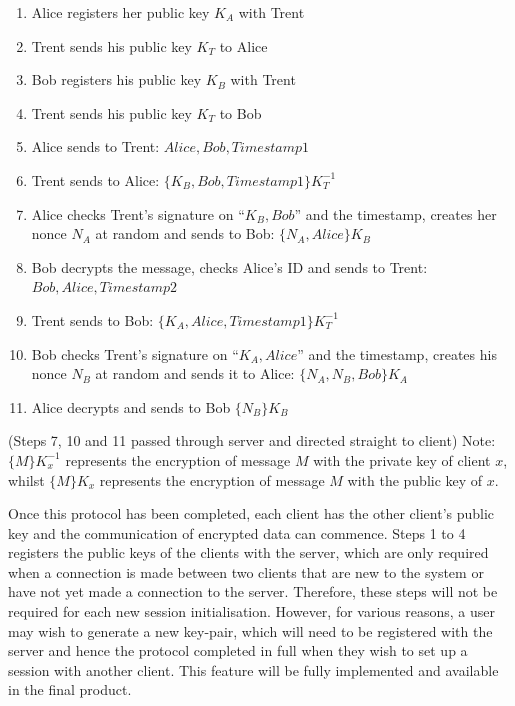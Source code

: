 \documentclass[a4paper,11pt]{article}
\begin{document}
\begin{enumerate}
  \item Alice registers her public key $ K_{A} $ with Trent
  \item Trent sends his public key $ K_{T} $ to Alice
  \item Bob registers his public key $ K_{B} $ with Trent
  \item Trent sends his public key $ K_{T} $ to Bob
  \item Alice sends to Trent: $ Alice, Bob, Timestamp1 $
  \item Trent sends to Alice: $ \{K_{B},Bob, Timestamp1\} K_{T}^{-1} $
  \item Alice checks Trent’s signature on “$ {K_{B},Bob} $” and the timestamp, creates her nonce $ N_{A} $ at random and sends to Bob: $ \{N_{A} , Alice \}K_{B} $
  \item Bob decrypts the message, checks Alice’s ID and sends to Trent: $ Bob, Alice, Timestamp2 $
  \item Trent sends to Bob: $ \{K_{A} , Alice, Timestamp1\}K_{T}^{-1} $
  \item Bob checks Trent’s signature on “$ K_{A}, Alice $” and the timestamp, creates his nonce $ N_{B} $ at random and sends it to Alice: $ \{N_{A}, N_{B}, Bob\}K_{A} $
  \item Alice decrypts and sends to Bob $ \{N_{B}\}K_{B} $
\end{enumerate}

(Steps 7, 10 and 11 passed through server and directed straight to client)
Note: $ \{M\}K_{x}^{-1} $ represents the encryption of message $ M $ with the private key of client $ x $, whilst $ \{M\}K_{x} $ represents the encryption of message $ M $ with the public key of $ x $.

Once this protocol has been completed, each client has the other client’s public key and the communication of encrypted data can commence. Steps 1 to 4 registers the public keys of the clients with the server, which are only required when a connection is made between two clients that are new to the system or have not yet made a connection to the server. Therefore, these steps will not be required for each new session initialisation. However, for various reasons, a user may wish to generate a new key-pair, which will need to be registered with the server and hence the protocol completed in full when they wish to set up a session with another client. This feature will be fully implemented and available in the final product. 
\end{document}
